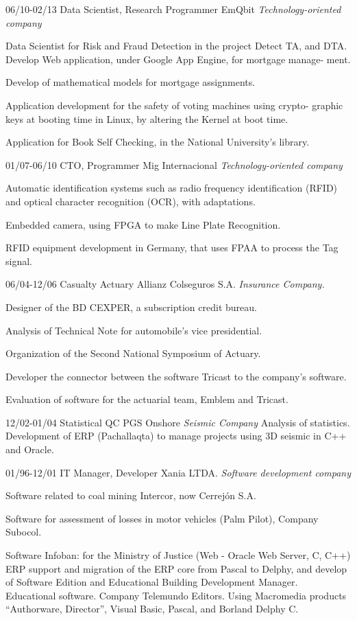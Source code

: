 \begin{entrylist}
  \entry
	{06/10-02/13}
	{Data Scientist, Research Programmer}
	{EmQbit {\sl Technology-oriented company}}
	{Data Scientist for Risk and Fraud Detection in the project Detect TA, and DTA.
Develop Web application, under Google App Engine, for mortgage manage-
ment.

Develop of mathematical models for mortgage assignments.

Application development for the safety of voting machines using crypto-
graphic keys at booting time in Linux, by altering the Kernel at boot time.

	Application for Book Self Checking, in the National University’s library.}
  \entry
	{01/07-06/10}
	{CTO, Programmer}
	{Mig Internacional {\sl Technology-oriented company}}
	{Automatic identification systems such as radio frequency identification (RFID)
and optical character recognition (OCR), with adaptations.

Embedded camera, using FPGA to make Line Plate Recognition.

RFID equipment development in Germany, that uses FPAA to process the
	Tag signal.}

  \entry
	{06/04-12/06}
	{Casualty Actuary}
	{Allianz Colseguros S.A. {\sl Insurance Company.}}
	{Designer of the BD CEXPER, a subscription credit bureau.

Analysis of Technical Note for automobile’s vice presidential.

Organization of the Second National Symposium of Actuary.

Developer the connector between the software Tricast to the company's software.

Evaluation of software for the actuarial team, Emblem and Tricast.}

  \entry
	{12/02-01/04}
	{Statistical QC}
	{PGS Onshore {\sl Seismic Company}}
	{Analysis of statistics. Development of ERP (Pachallaqta) to manage projects
	using 3D seismic in C++ and Oracle.}

  \entry
	{01/96-12/01}
	{IT Manager, Developer}
	{Xania LTDA. {\sl Software development company}}
	{Software related to coal mining Intercor, now Cerrejón S.A.

Software for assessment of losses in motor vehicles (Palm Pilot), Company
Subocol.

Software Infoban: for the Ministry of Justice (Web - Oracle Web Server, C, C++)
ERP support and migration of the ERP core from Pascal to Delphy, and develop
of Software Edition and Educational Building Development Manager.
Educational software. Company Telemundo Editors. Using Macromedia
products “Authorware, Director”, Visual Basic, Pascal, and Borland Delphy C.

}
\end{entrylist}
